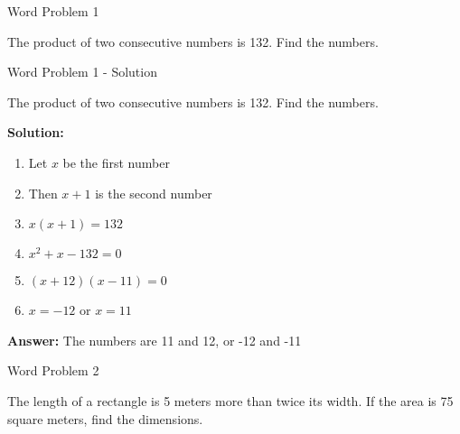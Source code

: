 \documentclass[aspectratio=169]{beamer}
\begin{document}
\begin{frame}{Word Problem 1}
    \begin{tcolorbox}[colback=lightgray,colframe=primary,title=Problem]
        \footnotesize
        The product of two consecutive numbers is 132. Find the numbers.
    \end{tcolorbox}
\end{frame}

\begin{frame}{Word Problem 1 - Solution}
    \begin{tcolorbox}[colback=lightgray,colframe=accent,title=Detailed Solution]
        \footnotesize
        The product of two consecutive numbers is 132. Find the numbers.
        
        \textbf{Solution:}
        \begin{enumerate}
            \setlength{\itemsep}{0.5em}
            \item Let $x$ be the first number
            \item Then $x + 1$ is the second number
            \item $x(x + 1) = 132$
            \item $x^2 + x - 132 = 0$
            \item $(x + 12)(x - 11) = 0$
            \item $x = -12$ or $x = 11$
        \end{enumerate}
        
        \textbf{Answer:} The numbers are 11 and 12, or -12 and -11
    \end{tcolorbox}
\end{frame}

\begin{frame}{Word Problem 2}
    \begin{tcolorbox}[colback=lightgray,colframe=primary,title=Problem]
        \footnotesize
        The length of a rectangle is 5 meters more than twice its width. If the area is 75 square meters, find the dimensions.
    \end{tcolorbox}
\end{frame}
\end{document}

